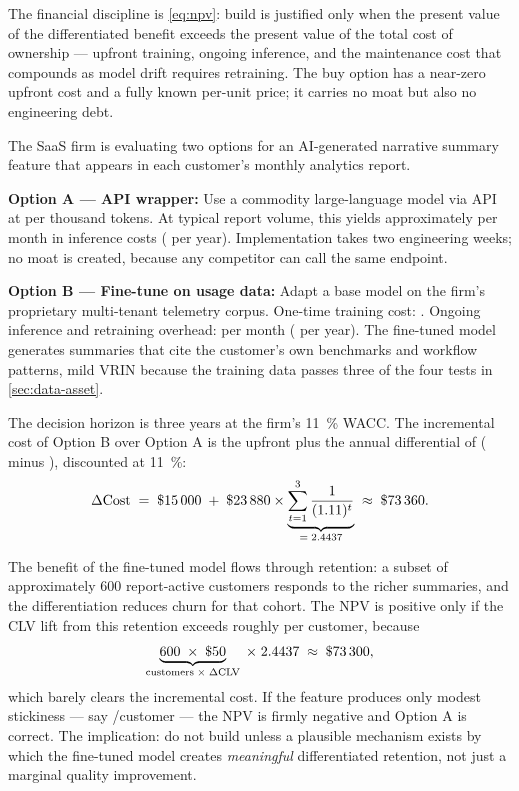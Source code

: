 The financial discipline is \cref{eq:npv}: build is justified only when the present value of
the differentiated benefit exceeds the present value of the total cost of ownership — upfront
training, ongoing inference, and the maintenance cost that compounds as model drift requires
retraining. The buy option has a near-zero upfront cost and a fully known per-unit price; it
carries no moat but also no engineering debt.

\begin{example}
The SaaS firm is evaluating two options for an AI-generated narrative summary feature that
appears in each customer's monthly analytics report.

\textbf{Option A — API wrapper:} Use a commodity large-language model via API at
 per thousand tokens. At typical report volume, this yields approximately
 per month in inference costs ( per year). Implementation takes two
engineering weeks; no moat is created, because any competitor can call the same endpoint.

\textbf{Option B — Fine-tune on usage data:} Adapt a base model on the firm's proprietary
multi-tenant telemetry corpus. One-time training cost: . Ongoing inference
and retraining overhead:  per month ( per year). The fine-tuned
model generates summaries that cite the customer's own benchmarks and workflow patterns,
mild VRIN because the training data passes three of the four tests in \cref{sec:data-asset}.

The decision horizon is three years at the firm's \qty{11}{\percent} WACC. The incremental
cost of Option B over Option A is the  upfront plus the annual differential
of  ( minus ), discounted at \qty{11}{\percent}:
\[
  \Delta\mathrm{Cost} \;=\; \$\num{15000}
    \;+\; \$\num{23880}\times
    \underbrace{\sum_{t=1}^{3}\frac{1}{(1.11)^{t}}}_{=\;2.4437}
  \;\approx\; \$\num{73360}.
\]

The benefit of the fine-tuned model flows through retention: a subset of approximately 600
report-active customers responds to the richer summaries, and the differentiation reduces
churn for that cohort. The NPV is positive only if the CLV lift from this retention
exceeds roughly  per customer, because
\[
  \underbrace{600\;\times\;\$\num{50}}_{\text{customers}\;\times\;\Delta\mathrm{CLV}}
  \;\times\; 2.4437
  \;\approx\; \$\num{73300},
\]
which barely clears the incremental cost. If the feature produces only modest
stickiness — say /customer — the NPV is firmly negative and Option A is correct.
The implication: do not build unless a plausible mechanism exists by which the fine-tuned
model creates \emph{meaningful} differentiated retention, not just a marginal quality
improvement.
\end{example}


